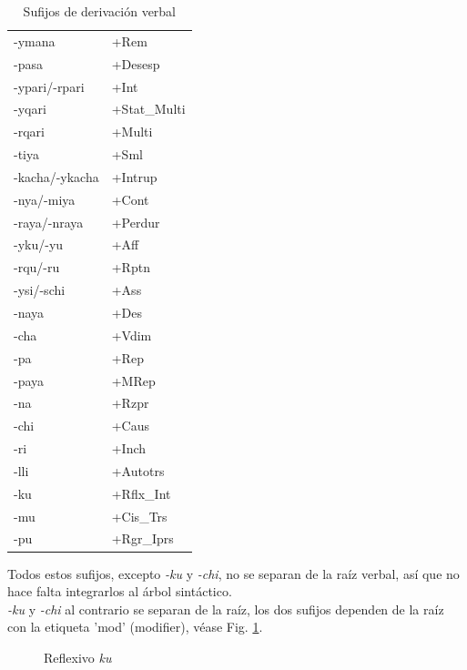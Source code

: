 \documentclass[a4paper,11pt,DIV12]{scrartcl}
\begin{document}
\begin{table}
\caption{Sufijos de derivaci\'on verbal}\label{Tab:VDeriv}
\begin{center}
\begin{tabular}{ll}
\toprule
-ymana & +Rem\\
-pasa  & +Desesp\\
-ypari/-rpari & +Int\\
-yqari & +Stat\_Multi\\
-rqari & +Multi\\
-tiya & +Sml\\
-kacha/-ykacha & +Intrup\\
-nya/-miya & +Cont\\
-raya/-nraya & +Perdur\\
-yku/-yu & +Aff\\
-rqu/-ru & +Rptn\\
-ysi/-schi & +Ass\\
-naya & +Des \\
-cha & +Vdim\\
-pa & +Rep\\
-paya & +MRep\\
-na & +Rzpr\\
-chi & +Caus\\
-ri & +Inch\\
-lli & +Autotrs\\
-ku & +Rflx\_Int\\
-mu & +Cis\_Trs\\
-pu & +Rgr\_Iprs\\
\bottomrule
\end{tabular}
\end{center}
\end{table}

Todos estos sufijos, excepto \textit{-ku} y {\em -chi}, no se separan de la ra\'iz verbal, as\'i que no hace falta integrarlos al \'arbol sint\'actico. \\
{\em -ku} y {\em -chi} al contrario se separan de la ra\'iz, los dos sufijos dependen de la ra\'iz con la etiqueta 'mod' (modifier), v\'ease Fig. \ref{Fig:ku}.

\begin{figure}
\begin{center}
\caption{Reflexivo {\em ku}}\label{Fig:ku}
\end{center}
\end{figure}
\end{document}
